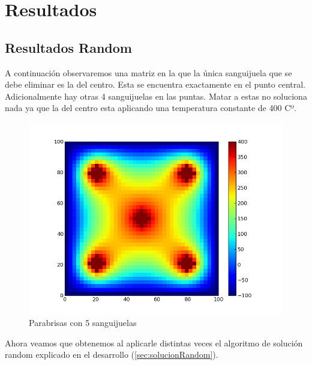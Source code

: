 \section{Resultados}

\subsection{Resultados Random}

A continuación observaremos una matriz en la que la única sanguijuela que se debe eliminar es la del centro. Esta se encuentra exactamente en el punto central. Adicionalmente hay otras 4 sanguijuelas en las puntas. Matar a estas no soluciona nada ya que la del centro esta aplicando una temperatura constante de 400 Cº. 

\begin{figure}[htb]
\begin{center}
\includegraphics[scale=0.70]{imagenes/test5.png} 
\caption{Parabrisas con 5 sanguijuelas} 
\end{center}
\end{figure}


Ahora veamos que obtenemos al aplicarle distintas veces el algoritmo de solución random explicado en el desarrollo (\ref{sec:solucionRandom}).
\newpage

